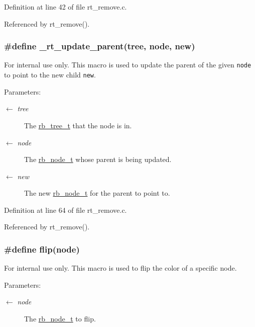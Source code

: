 Definition at line 42 of file rt\_\-remove.c.

Referenced by rt\_\-remove().\hypertarget{group__dbprim__rbtree_ga47}{
\subsubsection[\_\-rt\_\-update\_\-parent]{\setlength{\rightskip}{0pt plus 5cm}\#define \_\-rt\_\-update\_\-parent(tree, node, new)}}
\label{group__dbprim__rbtree_ga47}


\begin{Desc}
\item[For internal use only.]
This macro is used to update the parent of the given {\tt node} to point to the new child {\tt new}.

\begin{Desc}
\item[Parameters:]
\begin{description}
\item[\mbox{$\leftarrow$} {\em tree}]The \hyperlink{group__dbprim__rbtree_ga0}{rb\_\-tree\_\-t} that the node is in. \item[\mbox{$\leftarrow$} {\em node}]The \hyperlink{group__dbprim__rbtree_ga1}{rb\_\-node\_\-t} whose parent is being updated. \item[\mbox{$\leftarrow$} {\em new}]The new \hyperlink{group__dbprim__rbtree_ga1}{rb\_\-node\_\-t} for the parent to point to.\end{description}
\end{Desc}
\end{Desc}


Definition at line 64 of file rt\_\-remove.c.

Referenced by rt\_\-remove().\hypertarget{group__dbprim__rbtree_ga45}{
\subsubsection[flip]{\setlength{\rightskip}{0pt plus 5cm}\#define flip(node)}}
\label{group__dbprim__rbtree_ga45}


\begin{Desc}
\item[For internal use only.]
This macro is used to flip the color of a specific node.

\begin{Desc}
\item[Parameters:]
\begin{description}
\item[\mbox{$\leftarrow$} {\em node}]The \hyperlink{group__dbprim__rbtree_ga1}{rb\_\-node\_\-t} to flip.\end{description}
\end{Desc}
\end{Desc}


